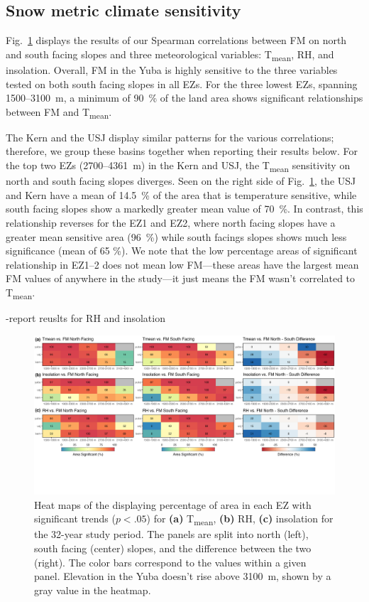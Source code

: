\hypertarget{ch2-results-3}{\subsection{Snow metric climate sensitivity}\label{ch2-results-3}}

Fig.~\ref{fig:heat_map} displays the results of our Spearman correlations between FM on north and south facing slopes and three meteorological variables: T\textsubscript{mean}, RH, and insolation. Overall, FM in the Yuba is highly sensitive to the three variables tested on both south facing slopes in all EZs. For the three lowest EZs, spanning 1500--3100~m, a minimum of 90~\% of the land area shows significant relationships between FM and T\textsubscript{mean}. 

The Kern and the USJ display similar patterns for the various correlations; therefore, we group these basins together when reporting their results below. For the top two EZs (2700--4361~m) in the Kern and USJ, the T\textsubscript{mean} sensitivity on north and south facing slopes diverges. Seen on the right side of Fig.~\ref{fig:heat_map}, the USJ and Kern have a mean of 14.5~\% of the area that is temperature sensitive, while south facing slopes show a markedly greater mean value of 70~\%. In contrast, this relationship reverses for the EZ1 and EZ2, where north facing slopes have a greater mean sensitive area (96~\%) while south facings slopes shows much less significance (mean of 65 \%). We note that the low percentage areas of significant relationship in EZ1--2 does not mean low FM---these areas have the largest mean FM values of anywhere in the study---it just means the FM wasn't correlated to T\textsubscript{mean}.

-report reuslts for RH and insolation


\begin{figure}[h]
\centering
\includegraphics[width=\textwidth]{figures/ch2_figs/metvars_fm_heatmaps_v4.png}
\caption{Heat maps of the displaying percentage of area in each EZ with significant trends ($p < .05$) for \textbf{(a)} T\textsubscript{mean}, \textbf{(b)} RH, \textbf{(c)} insolation for the 32-year study period. The panels are split into north (left), south facing (center) slopes, and the difference between the two (right). The color bars correspond to the values within a given panel. Elevation in the Yuba doesn't rise above 3100~m, shown by a gray value in the heatmap.}
\label{fig:heat_map}
\end{figure}



